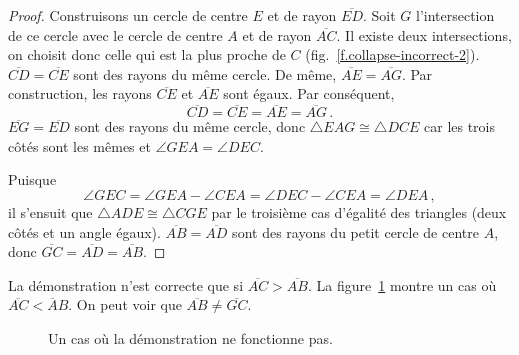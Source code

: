 \begin{proof}
Construisons un cercle de centre $E$ et de rayon $\overline{ED}$. Soit $G$ l'intersection de ce cercle avec le cercle de centre $A$ et de rayon $\overline{AC}$. Il existe deux intersections, on choisit donc celle qui est la plus proche de $C$ (fig.~\ref{f.collapse-incorrect-2}).
$\overline{CD}=\overline{CE}$ sont des rayons du même cercle. De même,  $\overline{AE}=\overline{AG}$. Par construction, les rayons $\overline{CE}$ et $\overline{AE}$ sont égaux. Par conséquent,
\[
\overline{CD} = \overline{CE} = \overline{AE} = \overline{AG}\,.
\]
$\overline{EG} = \overline{ED}$ sont des rayons du même cercle, donc $\triangle EAG\cong \triangle DCE$ car les trois côtés sont les mêmes et $\angle GEA = \angle DEC$.



Puisque
\[
\angle GEC = \angle GEA \!-\!\angle CEA = \angle DEC\!-\!\angle CEA = \angle DEA\,,
\] 
il s'ensuit que $\triangle ADE\cong\triangle CGE$ par le troisième cas d'égalité des triangles (deux côtés et un angle égaux). $\overline{AB}=\overline{AD}$ sont des rayons du petit cercle de  centre  $A$, donc $\overline{GC}=\overline{AD}=\overline{AB}$.
\end{proof}

La démonstration n'est correcte que si $\overline{AC}>\overline{AB}$.  La figure~\ref{f.collapse-incorrect-4} montre un cas où $\overline{AC}<\overline{A}B$. On peut voir que $\overline{AB}\neq\overline{GC}$.

\begin{figure}[htbp]
\centering
{}
     \caption{Un cas où la démonstration ne fonctionne pas.}
     \label{f.collapse-incorrect-4}
\end{figure}



